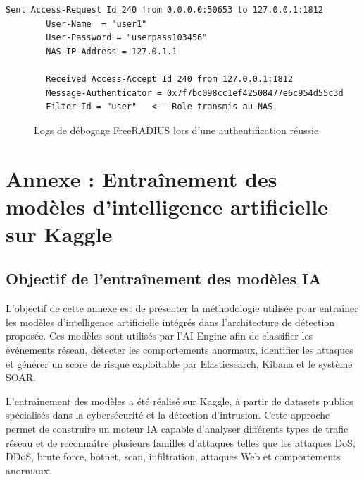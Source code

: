 \documentclass[12pt,a4paper,oneside]{report}
\begin{document}
	\begin{lstlisting}[caption={Exemple de réponse Access-Accept avec Filter-Id transmis}]
		Sent Access-Request Id 240 from 0.0.0.0:50653 to 127.0.0.1:1812
		User-Name  = "user1"
		User-Password = "userpass103456"
		NAS-IP-Address = 127.0.1.1
		
		Received Access-Accept Id 240 from 127.0.0.1:1812
		Message-Authenticator = 0x7f7bc098cc1ef42508477e6c954d55c3d
		Filter-Id = "user"   <-- Role transmis au NAS
	\end{lstlisting}
	
	\begin{figure}[H]
		\centering
		\caption{Logs de débogage FreeRADIUS lors d'une authentification réussie}
		\label{fig:freeradius-debug}
	\end{figure}
	\section{Annexe : Entraînement des modèles d'intelligence artificielle sur Kaggle}
	
	\subsection{Objectif de l'entraînement des modèles IA}
	
	L'objectif de cette annexe est de présenter la méthodologie utilisée pour entraîner les modèles d'intelligence artificielle intégrés dans l'architecture de détection proposée. Ces modèles sont utilisés par l'AI Engine afin de classifier les événements réseau, détecter les comportements anormaux, identifier les attaques et générer un score de risque exploitable par Elasticsearch, Kibana et le système SOAR.
	
	L'entraînement des modèles a été réalisé sur Kaggle, à partir de datasets publics spécialisés dans la cybersécurité et la détection d'intrusion. Cette approche permet de construire un moteur IA capable d'analyser différents types de trafic réseau et de reconnaître plusieurs familles d'attaques telles que les attaques DoS, DDoS, brute force, botnet, scan, infiltration, attaques Web et comportements anormaux.
	
\end{document}

